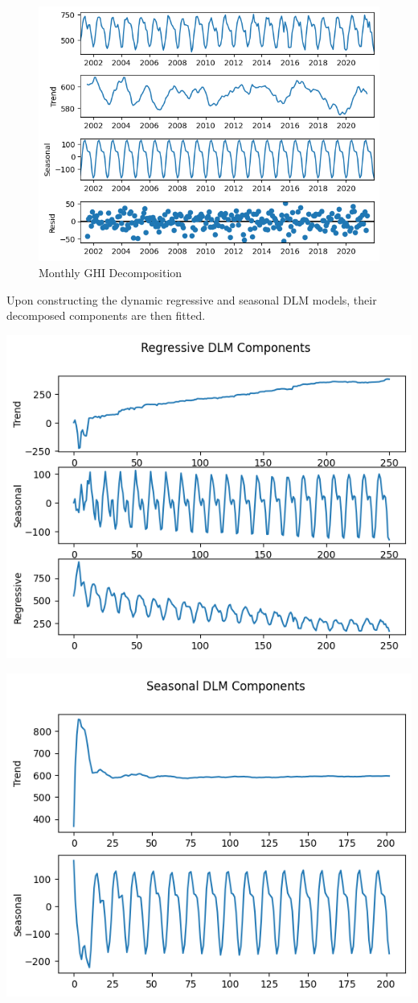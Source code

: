 \documentclass[a4paper,12pt]{article}
\begin{document}
\begin{figure}[htbp]
\centering
\includegraphics[width=1.00\textwidth]{./images/bhadla/monthlyDecomp.png}
Monthly GHI Decomposition
\end{figure}

Upon constructing the dynamic regressive and seasonal DLM models, their decomposed components are then fitted.

\begin{center}
\includegraphics[width=0.7\linewidth]{./images/bhadla/monthlyRegDecomp.png}
\end{center}

\begin{center}
\includegraphics[width=0.7\linewidth]{./images/bhadla/monthlySeasDecomp.png}
\end{center}
\end{document}
